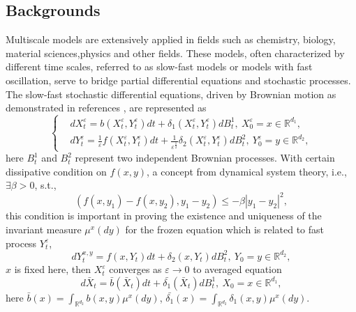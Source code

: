\documentclass[11pt,reqno]{amsart}
\numberwithin{equation}{section}
\begin{document}
\subsection{Backgrounds}Multiscale models are extensively applied in fields such as chemistry, biology, material sciences,physics and other fields. These models, often characterized by different time scales, referred to as slow-fast models or models with fast oscillation, serve to bridge partial differential equations and stochastic processes. The slow-fast stochastic differential equations, driven by Brownian motion as demonstrated in references \cite{RZK,AYV}, are represented as
\begin{equation}\label{1}
\left\{
\begin{aligned}
	& dX_{t}^{\varepsilon}=b(X_{t}^{\varepsilon},Y_{t}^{\varepsilon})dt+\delta_{1}(X_{t}^{\varepsilon},Y_{t}^{\varepsilon})dB^{1}_{t},\ X^{\varepsilon}_{0}=x\in \mathbb{R}^{d_{1} },\\
	&dY_{t}^{\varepsilon}=\frac{1}{\varepsilon}f(X_{t}^{\varepsilon},Y_{t}^{\varepsilon})dt+\frac{1}{\varepsilon^{\frac{1}{2}}}\delta_{2}(X_{t}^{\varepsilon},Y_{t}^{\varepsilon})dB^{2}_{t},\ Y^{\varepsilon}_{0}=y\in \mathbb{R}^{d_{2}},
\end{aligned}
\right.
\end{equation}
here $ B^{1}_{t}$ and $ B^{2}_{t}$ represent two independent Brownian processes. With certain dissipative condition on $f(x,y)$, a concept from dynamical system theory,
i.e., $\exists\beta>0$, s.t.,
$$
( f(x,y_{1})-f(x,y_{2}),y_{1}-y_{2})  \leq-\beta|y_{1}-y_{2}|^{2},
$$
 this condition is important in proving the existence and uniqueness of the invariant measure  $ \mu^{x}(dy)$ for the frozen equation which is related to fast process $Y_{t}^{\varepsilon}$,
$$
		dY_{t}^{x,y}=f(x,Y_{t})dt+\delta_{2}(x,Y_{t})dB^{2}_{t},\ Y_{0}=y\in \mathbb{R}^{d_{2}},
$$
$x$ is fixed here, then $X_{t}^{\varepsilon}$ converges as
$\varepsilon \rightarrow0$ to averaged equation 
$$
d\bar{X}_{t}=\bar{b}(\bar{X}_{t})dt+\bar{\delta_{1}}(\bar{X}_{t})dB^{1}_{t},\ X_{0}=x\in \mathbb{R}^{d_{1}},
$$
here $\bar{b}(x)=\int_{\mathbb{R}^{d_{2}}}b(x,y)\mu^{x}(dy)$, $\bar{\delta_{1}}(x)=\int_{\mathbb{R}^{d_{2}}}\delta_{1}(x,y)\mu^{x}(dy)$. 
\end{document}
